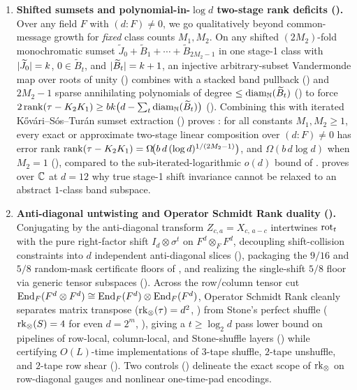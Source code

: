 \begin{enumerate}[label=\arabic*.]
\item \textbf{Shifted sumsets and polynomial-in-$\log d$ two-stage rank deficits ().}
  Over any field $F$ with $(d : F) \ne 0$, we go qualitatively beyond common-message growth for
  \emph{fixed} class counts $M_1, M_2$. On any shifted $(2M_2)$-fold monochromatic sumset
  $\widetilde{J}_0 + \widetilde{B}_1 + \cdots + \widetilde{B}_{2M_2-1}$ in one stage-1 class with
  $\lvert \widetilde{J}_0 \rvert = k$, $0 \in \widetilde{B}_t$, and $\lvert \widetilde{B}_t \rvert = k + 1$, an
  injective arbitrary-subset Vandermonde map over roots of unity ()
  combines with a stacked band pullback () and $2M_2 - 1$ sparse
  annihilating polynomials of degree $\le \operatorname{diam}_{\mathbb{N}}(\widetilde{B}_t)$ () to
  force $2\operatorname{rank}(\tau - K_2 K_1) \ge bk\bigl(d - \sum_t \operatorname{diam}_{\mathbb{N}}(\widetilde{B}_t)\bigr)$
  (). Combining this with iterated K\H{o}v\'ari--S\'os--Tur\'an sumset
  extraction () proves : for all constants $M_1, M_2 \ge 1$,
  every exact or approximate two-stage linear composition over $(d : F) \ne 0$ has error rank
  $\operatorname{rank}(\tau - K_2 K_1) = \Omega\!\bigl(b\,d\,(\log d)^{1/(2M_2-1)}\bigr)$, and $\Omega(b\,d\log d)$
  when $M_2 = 1$ (), compared to the sub-iterated-logarithmic $o(d)$ bound of
  \cite[Theorem~6.6]{SharedDecoders2026}.  proves over $\mathbb{C}$ at $d = 12$ why true
  stage-1 shift invariance cannot be relaxed to an abstract $1$-class band subspace.

\item \textbf{Anti-diagonal untwisting and Operator Schmidt Rank duality ().}
  Conjugating by the anti-diagonal transform $Z_{c,a} = X_{c,\,a-c}$ intertwines $\operatorname{rot}_t$ with the
  pure right-factor shift $I_d \otimes \sigma^t$ on $F^d \otimes_F F^d$, decoupling
  shift-collision constraints into $d$ independent anti-diagonal slices (),
  packaging the $9/16$ and $5/8$ random-mask certificate floors of
  \cite[Appendix~C]{SharedDecoders2026}, and realizing the single-shift $5/8$ floor via generic
  tensor subspaces (). Across the row/column tensor cut
  $\operatorname{End}_F(F^d \otimes F^d) \cong \operatorname{End}_F(F^d) \otimes \operatorname{End}_F(F^d)$, Operator Schmidt Rank cleanly
  separates matrix transpose ($\operatorname{rk}_{\otimes}(\tau) = d^2$, ) from Stone's perfect shuffle
  ($\operatorname{rk}_{\otimes}(S) = 4$ for even $d = 2^m$, ), giving a $t \ge \log_2 d$ pass lower
  bound on pipelines of row-local, column-local, and Stone-shuffle layers ()
  while certifying $O(L)$-time  implementations of $3$-tape shuffle, $2$-tape
  unshuffle, and $2$-tape row shear (). Two controls
  () delineate the exact scope of $\operatorname{rk}_{\otimes}$ on row-diagonal
  gauges and nonlinear one-time-pad encodings.


\end{enumerate}
